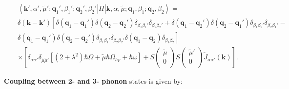 \documentclass[pt12]{article}
\newcommand{\bfk}{\mathbf{k}}
\newcommand{\bfq}{\mathbf{q}}
\newcommand{\tmu}{\tilde{\mu}}
\begin{document}
\begin{eqnarray}\label{3P_H_3P}
&& \left< \bfk',\alpha',\tmu'; \bfq_1',\beta_1' ; \bfq_2',\beta_2'
\right| H \left|\bfk,\alpha,\tmu;
\bfq_1,\beta_1 ; \bfq_2,\beta_2 \right> = \\
\nonumber && \delta (\bfk-\bfk') \left[ \delta (\bfq_1-\bfq_1')
\delta(\bfq_2-\bfq_2') \delta_{\beta_1\beta_1'}
\delta_{\beta_2\beta_2'} + \delta (\bfq_1-\bfq_2')
\delta(\bfq_2-\bfq_1') \delta_{\beta_1\beta_2'}
\delta_{\beta_2\beta_1'} - \right. \\
\nonumber && \left. \delta (\bfq_1-\bfq_1') \delta(\bfq_2-\bfq_2')
\delta_{\beta_1\beta_1'}
\delta_{\beta_2\beta_2'}\delta(\bfq_1-\bfq_2)
\delta_{\beta_1\beta_2}  \right]\\ \nonumber && \times
\left[\delta_{\alpha\alpha'} \delta_{\tmu\tmu'} \left[ \left( 2 +
\lambda^2 \right) \hbar \Omega + \tmu \hbar \Omega_{hp}+\hbar \omega
\right] + S\left(
                                \begin{array}{c}
                                    \tmu \\
                                    0 \\
                                  \end{array}
                                \right)
S\left(
                                \begin{array}{c}
                                    \tmu' \\
                                    0 \\
                                  \end{array}
                                \right)
\tilde{J}_{\alpha\alpha'}(\bfk)\right].
\end{eqnarray}

\textbf{Coupling between 2- and 3- phonon} states is given by:
\end{document}
